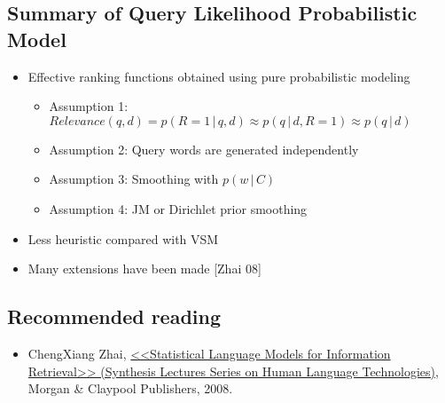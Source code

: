 \subsection{Summary of Query Likelihood Probabilistic Model}
\begin{itemize}
\item Effective ranking functions obtained using pure probabilistic modeling

\begin{itemize}
\item Assumption 1: $Relevance(q,d) = p(R=1 \,\big|\, q,d) \approx p(q \,\big|\, d,R=1) \approx p(q \,\big|\, d)$
\item Assumption 2: Query words are generated independently
\item Assumption 3: Smoothing with $p(w \,\big|\, C)$
\item Assumption 4: JM or Dirichlet prior smoothing
\end{itemize}

\item Less heuristic compared with VSM
\item Many extensions have been made [Zhai 08]
\end{itemize}

\subsection{Recommended reading}
\begin{itemize}
\item ChengXiang Zhai, \href{http://www.morganclaypool.com/doi/abs/10.2200/S00158ED1V01Y200811HLT001}{<<Statistical Language Models for Information Retrieval>> (Synthesis Lectures Series on Human Language Technologies)}, Morgan \& Claypool Publishers, 2008.
\end{itemize}

